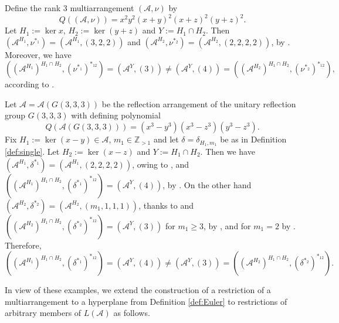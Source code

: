 \begin{example}
\label{ex:heredindfree1}
Define the rank $3$ multiarrangement
$({{\mathcal A}},\nu)$ by 
\[
Q(({{\mathcal A}},\nu)) = x^2y^2(x+y)^2(x+z)^2(y+z)^2.
\]
Let $H_1 := \ker x$, $H_2 := \ker (y+z)$ and $Y := H_1 \cap H_2$.
Then $({{\mathcal A}}^{H_1},\nu^{*_1}) = ({{\mathcal A}}^{H_1},(3,2,2))$
 and $({{\mathcal A}}^{H_2},\nu^{*_2}) = ({{\mathcal A}}^{H_2},(2,2,2,2))$, by
\cite[Prop.\ 4.1(6)]{abeteraowakefield:euler}. Moreover, we have
\[
  \left(\left( {{\mathcal A}}^{H_1}\right)^{H_1\cap H_2},(\nu^{*_1})^{*_{12}}\right) =
   \left({{\mathcal A}}^Y,(3) \right) \not= \left( {{\mathcal A}}^Y,(4)\right) =
   \left(\left( {{\mathcal A}}^{H_2}\right)^{H_1\cap H_2},(\nu^{*_2})^{*_{12}}\right),
\]
according to \cite[Prop.\ 4.1(7), (6)]{abeteraowakefield:euler}.
\end{example}

\begin{example} 
\label{ex:heredindfree2}
Let ${{\mathcal A}} = {{\mathcal A}}(G(3,3,3))$ be the 
reflection arrangement of the 
unitary reflection group $G(3,3,3)$
with defining polynomial 
\[
Q({{\mathcal A}}(G(3,3,3))) = (x^3- y^3)(x^3- z^3)(y^3- z^3).
\]
Fix $H_1 := \ker (x-y) \in {{\mathcal A}}$, $m_1 \in {{\mathbb Z}}_{>1}$ and let 
$\delta = \delta_{H_1,m_1}$ be 
as in Definition \ref{def:single}.
Let $H_2 := \ker (x-z)$ and 
$Y := H_1 \cap H_2$. Then we have
$({{\mathcal A}}^{H_1},\delta^{*_1}) = ({{\mathcal A}}^{H_1},(2,2,2,2))$,
owing to 
\cite[Prop.\ 4.1(2)]{abeteraowakefield:euler}, and 
$(({{\mathcal A}}^{H_1})^{H_1 \cap H_2},(\delta^{*_1})^{*_{12}}) = ({{\mathcal A}}^Y,(4))$, 
by \cite[Prop.\ 4.1(6)]{abeteraowakefield:euler}. On the other hand
$({{\mathcal A}}^{H_2},\delta^{*_2}) = ({{\mathcal A}}^{H_2},(m_1,1,1,1))$, thanks to 
\cite[Prop.\ 4.1(3)]{abeteraowakefield:euler} and 
$(({{\mathcal A}}^{H_2})^{H_1\cap H_2},(\delta^{*_2})^{*_{12}}) = ({{\mathcal A}}^Y,(3))$ 
for $m_1 \ge 3$, by \cite[Prop.\ 4.1(2)]{abeteraowakefield:euler}, 
and for $m_1 = 2$ by 
\cite[Prop.\ 4.1(4)]{abeteraowakefield:euler}. 
Therefore,
\[
\left(\left({{\mathcal A}}^{H_1}\right)^{H_1 \cap H_2},\left(\delta^{*_1}\right)^{*_{12}}\right) 
= \left({{\mathcal A}}^Y,(4)\right) \not= \left({{\mathcal A}}^Y,(3)\right) 
= \left(\left({{\mathcal A}}^{H_2}\right)^{H_1\cap H_2},\left(\delta^{*_2}\right)^{*_{12}}\right).
\]
\end{example}

In view of these examples, 
we extend the construction 
of a restriction of a multiarrangement to a hyperplane 
from Definition \ref{def:Euler} to 
restrictions of arbitrary members of $L({{\mathcal A}})$ as follows.

